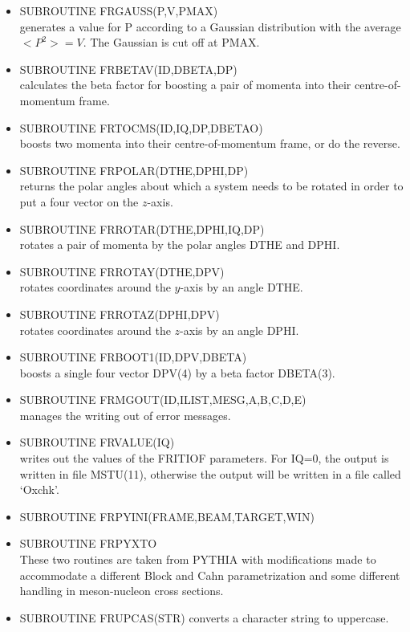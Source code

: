 \begin{itemize}
\item  SUBROUTINE FRGAUSS(P,V,PMAX) \\
 generates a value for P according to a Gaussian distribution with the average
 $<P^2> = V$.  The Gaussian is cut off at PMAX.

\item  SUBROUTINE FRBETAV(ID,DBETA,DP) \\
 calculates the beta factor for boosting a pair of momenta
 into their centre-of-momentum frame.

\item  SUBROUTINE FRTOCMS(ID,IQ,DP,DBETAO) \\
 boosts two momenta into their centre-of-momentum frame, or do the reverse.

\item  SUBROUTINE FRPOLAR(DTHE,DPHI,DP) \\
 returns the polar angles about which a system needs to be rotated in order 
 to put a four vector on the $z$-axis.

\item  SUBROUTINE FRROTAR(DTHE,DPHI,IQ,DP) \\
 rotates a pair of momenta by the polar angles DTHE and DPHI.

\item  SUBROUTINE FRROTAY(DTHE,DPV) \\
 rotates coordinates around the $y$-axis by an angle DTHE.

\item  SUBROUTINE FRROTAZ(DPHI,DPV) \\
 rotates coordinates around the $z$-axis by an angle DPHI.

\item  SUBROUTINE FRBOOT1(ID,DPV,DBETA) \\
 boosts a single four vector DPV(4) by a beta factor DBETA(3).

\item  SUBROUTINE FRMGOUT(ID,ILIST,MESG,A,B,C,D,E) \\
 manages the writing out of error messages.

\item  SUBROUTINE FRVALUE(IQ) \\
 writes out the values of the FRITIOF parameters.  For IQ=0, the output
 is written in file MSTU(11), otherwise the output will be written in
 a file called `Oxchk'.   

\item  SUBROUTINE FRPYINI(FRAME,BEAM,TARGET,WIN) \\
\item  SUBROUTINE FRPYXTO \\
 These two routines are taken from PYTHIA  
 with modifications made to accommodate a different Block and Cahn
 parametrization and some different handling in meson-nucleon cross sections. 

\item  SUBROUTINE FRUPCAS(STR)
 converts a character string to uppercase.  

\end{itemize} 

